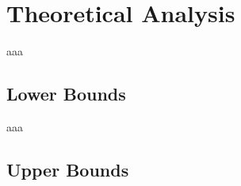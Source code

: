 \section{Theoretical Analysis}
\label{chap1-sec:theoretical}
aaa

\subsection{Lower Bounds}
\label{chap1-sub:lower_bounds}
aaa

\subsection{Upper Bounds}
\label{chap1-sub:upper_bounds}

